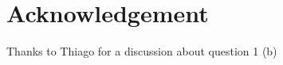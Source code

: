 \documentclass[10pt, a4paper]{article}
\begin{document}
{\section{Acknowledgement}

Thanks to Thiago for a discussion about question 1 (b)

}



\end{document}
